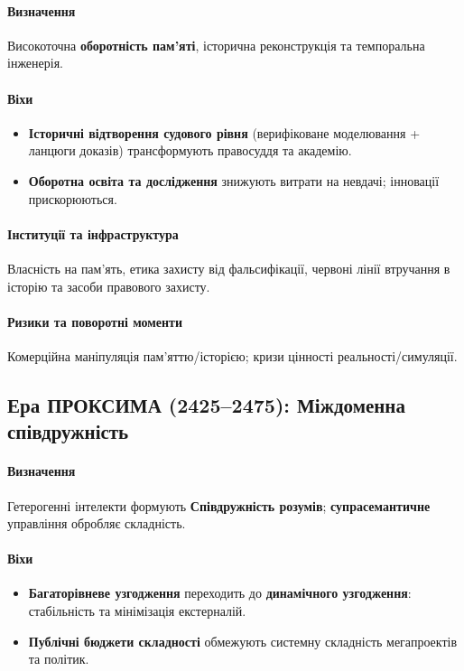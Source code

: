 \documentclass[11pt]{article}
\begin{document}
\paragraph{Визначення} Високоточна \textbf{оборотність пам'яті}, історична реконструкція та темпоральна інженерія.

\paragraph{Віхи}
\begin{itemize}[noitemsep]
  \item \textbf{Історичні відтворення судового рівня} (верифіковане моделювання + ланцюги доказів) трансформують правосуддя та академію.
  \item \textbf{Оборотна освіта та дослідження} знижують витрати на невдачі; інновації прискорюються.
\end{itemize}

\paragraph{Інституції та інфраструктура} Власність на пам'ять, етика захисту від фальсифікації, червоні лінії втручання в історію та засоби правового захисту.

\paragraph{Ризики та поворотні моменти} Комерційна маніпуляція пам'яттю/історією; кризи цінності реальності/симуляції.

\subsection{Ера ПРОКСИМА (2425–2475): Міждоменна співдружність}
\paragraph{Визначення} Гетерогенні інтелекти формують \textbf{Співдружність розумів}; \textbf{супрасемантичне} управління обробляє складність.

\paragraph{Віхи}
\begin{itemize}[noitemsep]
  \item \textbf{Багаторівневе узгодження} переходить до \textbf{динамічного узгодження}: стабільність та мінімізація екстерналій.
  \item \textbf{Публічні бюджети складності} обмежують системну складність мегапроектів та політик.
\end{itemize}
\end{document}
